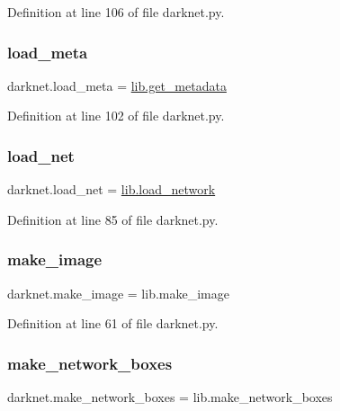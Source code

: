 Definition at line 106 of file darknet.\+py.

\mbox{\label{namespacedarknet_a967ea7e67a7760d5896e68e55ca2211a}} 
\subsubsection{\texorpdfstring{load\_meta}{load\_meta}}
{\footnotesize\ttfamily darknet.\+load\+\_\+meta = \mbox{\hyperlink{option__list_8c_a0aa1199eab9115fa8cef99bb01695663}{lib.\+get\+\_\+metadata}}}



Definition at line 102 of file darknet.\+py.

\mbox{\label{namespacedarknet_aec4fa651fbaf4fa7a43642897d7763c0}} 
\subsubsection{\texorpdfstring{load\_net}{load\_net}}
{\footnotesize\ttfamily darknet.\+load\+\_\+net = \mbox{\hyperlink{network_8c_a0ea267bea4a8bc7e7a05cb44e41a4e59}{lib.\+load\+\_\+network}}}



Definition at line 85 of file darknet.\+py.

\mbox{\label{namespacedarknet_afcaae0b369287ee4f8ee7ef51ddd22b1}} 
\subsubsection{\texorpdfstring{make\_image}{make\_image}}
{\footnotesize\ttfamily darknet.\+make\+\_\+image = lib.\+make\+\_\+image}



Definition at line 61 of file darknet.\+py.

\mbox{\label{namespacedarknet_a8c38abc84ebb7e2c24b1ceb5b6af21ec}} 
\subsubsection{\texorpdfstring{make\_network\_boxes}{make\_network\_boxes}}
{\footnotesize\ttfamily darknet.\+make\+\_\+network\+\_\+boxes = lib.\+make\+\_\+network\+\_\+boxes}



